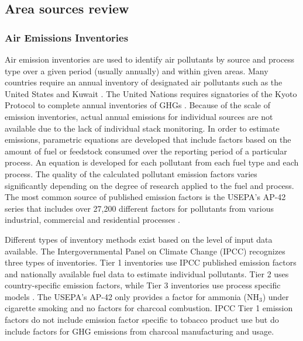 \subsection{Area sources review}

\subsubsection{Air Emissions Inventories}

Air emission inventories are used to identify air pollutants by source and process type over a given period (usually annually) and within given areas.  Many countries require an annual inventory of designated air pollutants such as the United States \citep{USEPA2014} and Kuwait \citep{KEPA2017}.  The United Nations requires signatories of the Kyoto Protocol to complete annual inventories of GHGs \citep{Paciornik2006}.  Because of the scale of emission inventories, actual annual emissions for individual sources are not available due to the lack of individual stack monitoring. In order to estimate emissions, parametric equations are developed that include factors based on the amount of fuel or feedstock consumed over the reporting period of a particular process.  An equation is developed for each pollutant from each fuel type and each process.  The quality of the calculated pollutant emission factors varies significantly depending on the degree of research applied to the fuel and process.  The most common source of published emission factors is the USEPA’s AP-42 series that includes over 27,200 different factors for pollutants from various industrial, commercial and residential processes \citep{USEPA1995}.

Different types of inventory methods exist based on the level of input data available. The Intergovernmental Panel on Climate Change (IPCC) recognizes three types of inventories.  Tier 1 inventories use IPCC published emission factors and nationally available fuel data to estimate individual pollutants.  Tier 2 uses country-specific emission factors, while Tier 3 inventories use process specific models \citep{Paciornik2006}.  The USEPA’s AP-42 only provides a factor for ammonia (NH$_{3}$) under cigarette smoking and no factors for charcoal combustion.  IPCC Tier 1 emission factors do not include emission factor specific to tobacco product use but do include factors for GHG emissions from charcoal manufacturing and usage. 

